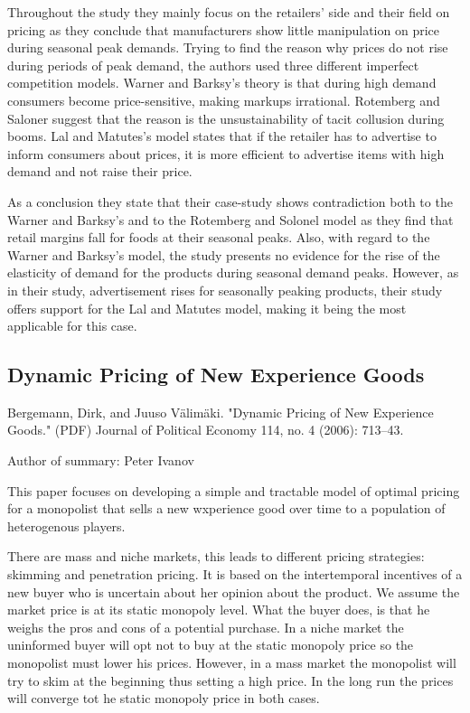 \documentclass[12pt]{report}
\numberwithin{equation}{section}
\begin{document}
Throughout the study they mainly focus on the retailers’ side and their field on pricing as they conclude that manufacturers show little manipulation on price during seasonal peak demands. Trying to find the reason why prices do not rise during periods of peak demand, the authors used three different imperfect competition models. Warner and Barksy’s theory is that during high demand consumers become price-sensitive, making markups irrational. Rotemberg and Saloner suggest that the reason is the unsustainability of tacit collusion during booms. Lal and Matutes’s model states that if the retailer has to advertise to inform consumers about prices, it is more efficient to advertise items with high demand and not raise their price.

As a conclusion they state that their case-study shows contradiction both to the Warner and Barksy’s and to the Rotemberg and Solonel model as they find that retail margins fall for foods at their seasonal peaks. Also, with regard to the Warner and Barksy’s model, the study presents no evidence for the rise of the elasticity of demand for the products during seasonal demand peaks. However, as in their study, advertisement rises for seasonally peaking products,  their study offers support for the Lal and Matutes model, making it being the most applicable for this case.

\newpage

\subsection{Dynamic Pricing of New Experience Goods}

Bergemann, Dirk, and Juuso Välimäki. "Dynamic Pricing of New Experience Goods." (PDF) Journal of Political Economy 114, no. 4 (2006): 713–43.

Author of summary: Peter Ivanov

This paper focuses on developing a simple and tractable model of optimal pricing for a monopolist that sells a new wxperience good over time to a population of heterogenous players.

There are mass and niche markets, this leads to different pricing strategies: skimming and penetration pricing. It is based on the intertemporal incentives of a new buyer who is uncertain about her opinion about the product. We assume the market price is at its static monopoly level. What the buyer does, is that he weighs the pros and cons of a potential purchase. In a niche market the uninformed buyer will opt not to buy at the static monopoly price so the monopolist must lower his prices. However, in a mass market the monopolist will try to skim at the beginning thus setting a high price. In the long run the prices will converge tot he static monopoly price in both cases.
\end{document}
